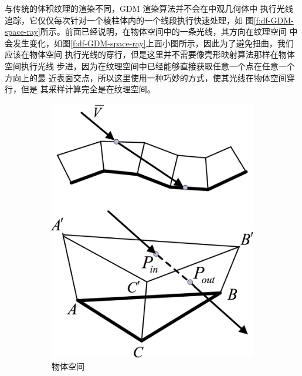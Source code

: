 与传统的体积纹理的渲染不同，GDM 渲染算法并不会在中观几何体中 执行光线追踪，它仅仅每次针对一个棱柱体内的一个线段执行快速处理，如 图\ref{f:df-GDM-space-ray}所示。前面已经说明，在物体空间中的一条光线，其方向在纹理空间 中会发生变化，如图\ref{f:df-GDM-space-ray}上面小图所示，因此为了避免扭曲，我们应该在物体空间 执行光线的穿行，但是这里并不需要像壳形映射算法那样在物体空间执行光线 步进，因为在纹理空间中已经能够直接获取任意一个点在任意一个方向上的最 近表面交点，所以这里使用一种巧妙的方式，使其光线在物体空间穿行，但是 其采样计算完全是在纹理空间。

\begin{figure}
\sidecaption
{
	\begin{subfigure}[b]{0.315\textwidth}
		\includegraphics[width=\textwidth]{figures/df/GDM-object-space-ray}
		\caption{物体空间}
	\end{subfigure}
	\begin{subfigure}[b]{0.315\textwidth}

\end{subfigure}}
\end{figure}
